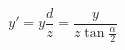 \documentclass[12pt]{article}
\begin{document}
    \[
        y'=y\frac{d}{z}=\frac{y}{z\tan{\frac{\alpha}{2}}}
    \]
\end{document}
